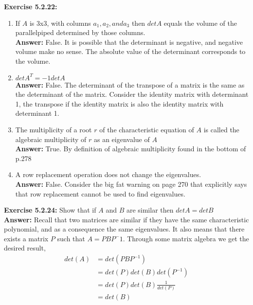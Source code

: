 \documentclass{amsart}
\begin{document}
\noindent\textbf{Exercise 5.2.22: }

\begin{enumerate}

\item If $A$ is 3x3, with columns $a_1, a_2, and a_3$ then $det A$ equals the volume of the parallelpiped determined by those columns.\\
\noindent \textbf{Answer: }False. It is possible that the determinant is negative, and negative volume make no sense. The absolute value of the determinant corresponds to the volume. 
\vspace{1in}


\item $det A^{T} = -1 det A$\\
\noindent \textbf{Answer: } False. The determinant of the transpose of a matrix is the same as the determinant of the matrix. Consider the identity matrix with determinant 1, the transpose if the identity matrix is also the identity matrix with determinant 1.
\vspace{1in}


\item The multiplicity of a root $r$ of the characteristic equation of $A$ is called the algebraic multiplicity of $r$ as an eigenvalue of $A$\\
\noindent \textbf{Answer: }True. By definition of algebraic multiplicity found in the bottom of p.278
\vspace{1in}


\item A row replacement operation does not change the eigenvalues.\\
\noindent \textbf{Answer: }False. Consider the big fat warning on page 270 that explicitly says that row replacement cannot be used to find eigenvalues.
\vspace{1in}

\end{enumerate}





\noindent\textbf{Exercise 5.2.24: } Show that if $A$ and $B$ are similar then $det A = det B$\\
\noindent \textbf{Answer: } Recall that two matrices are similar if they have the same characteristic polynomial, and as a consequence the same eigenvalues. It also means that there exists a matrix $P$ such that $A = PBP^-1$. Through some matrix algebra we get the desired result,
\begin{align*}
det(A) &= det(PBP^{-1})\\
&= det(P)det(B)det(P^{-1})\\
&= det(P)det(B)\frac{1}{det(P)}\\
&= det(B)
\end{align*}
\vspace{1in}
\end{document}

